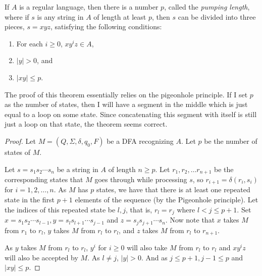 \begin{theorem}
If $A$ is a regular language, then there is a number $p$, called the \textit{pumping length}, where if $s$ is any string in $A$ of length at least $p$, then $s$ can be divided into three pieces, $s=xyz$, satisfying the following conditions:
\begin{enumerate}
    \item For each $i\geq 0$, $xy^iz\in A$,
    \item $|y|>0$, and
    \item $|xy|\leq p$.
\end{enumerate}
\end{theorem}

The proof of this theorem essentially relies on the pigeonhole principle. If I set $p$ as the number of states, then I will have a segment in the middle which is just equal to a loop on some state. Since concatenating this segment with itself is still just a loop on that state, the theorem seems correct.

\begin{proof}
Let $M=(Q,\Sigma,\delta,q_0,F)$ be a DFA recognizing $A$. Let $p$ be the number of states of $M$.

Let $s=s_1s_2\cdots s_n$ be a string in $A$ of length $n\geq p$. Let $r_1,r_2,\ldots r_{n+1}$ be the corresponding states that $M$ goes through while processing $s$, so $r_{i+1}=\delta(r_i,s_i)$ for $i=1,2,\ldots,n$. As $M$ has $p$ states, we have that there is at least one repeated state in the first $p+1$ elements of the sequence (by the Pigeonhole principle). Let the indices of this repeated state be $l,j$, that is, $r_l=r_j$ where $l< j\leq p+1$. Set $x=s_1s_2\cdots s_{l-1}, y=s_ls_{l+1}\cdots s_{j-1}$ and $z=s_js_{j+1}\cdots s_n$. Now note that $x$ takes $M$ from $r_1$ to $r_l$, $y$ takes $M$ from $r_l$ to $r_l$, and $z$ takes $M$ from $r_l$ to $r_{n+1}$.

As $y$ takes $M$ from $r_l$ to $r_l$, $y^i$ for $i\geq 0$ will also take $M$ from $r_l$ to $r_l$ and $xy^iz$ will also be accepted by $M$. As $l\neq j$, $|y|>0$. And as $j\leq p+1, j-1\leq p$ and $|xy|\leq p$.
\end{proof}

